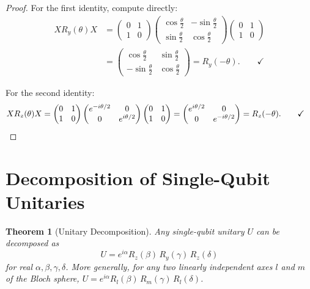 \documentclass[12pt, a4paper, oneside]{report}
\theoremstyle{plain}
\newtheorem{theorem}{Theorem}[chapter]
\theoremstyle{definition}
\theoremstyle{remark}
\newcommand{\Ry}{R_y}
\newcommand{\Rz}{R_z}
\begin{document}
\begin{proof}
For the first identity, compute directly:
\begin{align*}
  X\Ry(\theta)X
  &= \begin{pmatrix}0&1\\1&0\end{pmatrix}
     \begin{pmatrix}\cos\frac{\theta}{2}&-\sin\frac{\theta}{2}\\\sin\frac{\theta}{2}&\cos\frac{\theta}{2}\end{pmatrix}
     \begin{pmatrix}0&1\\1&0\end{pmatrix} \\
  &= \begin{pmatrix}\cos\frac{\theta}{2}&\sin\frac{\theta}{2}\\-\sin\frac{\theta}{2}&\cos\frac{\theta}{2}\end{pmatrix}
   = \Ry(-\theta). \qquad\checkmark
\end{align*}

For the second identity:
\begin{align*}
  X\Rz(\theta)X
  &= \begin{pmatrix}0&1\\1&0\end{pmatrix}
     \begin{pmatrix}e^{-i\theta/2}&0\\0&e^{i\theta/2}\end{pmatrix}
     \begin{pmatrix}0&1\\1&0\end{pmatrix}
   = \begin{pmatrix}e^{i\theta/2}&0\\0&e^{-i\theta/2}\end{pmatrix}
   = \Rz(-\theta). \qquad\checkmark \qedhere
\end{align*}
\end{proof}


\section{Decomposition of Single-Qubit Unitaries}

\begin{theorem}[Unitary Decomposition]
\label{thm:unitdecomp}
Any single-qubit unitary $U$ can be decomposed as
\[
  U = e^{i\alpha} \Rz(\beta)\, \Ry(\gamma)\, \Rz(\delta)
\]
for real $\alpha, \beta, \gamma, \delta$. More generally, for any two linearly independent
axes $l$ and $m$ of the Bloch sphere, $U = e^{i\alpha} R_l(\beta)\, R_m(\gamma)\, R_l(\delta)$.
\end{theorem}
\end{document}
